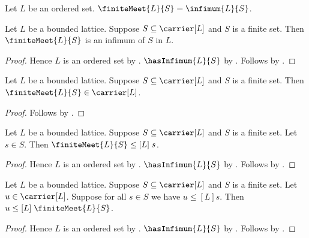 \begin{definition}\label{finite_meet}
    Let $L$ be an ordered set.
    $\finiteMeet{L}{S}=\infimum{L}{S}$.
\end{definition}

\begin{theorem}\label{finite_meet_is_infimum}
    Let $L$ be a bounded lattice.
    Suppose $S\subseteq\carrier[L]$ and $S$ is a finite set.
    Then $\finiteMeet{L}{S}$ is an infimum of $S$ in $L$.
\end{theorem}
\begin{proof}
    Hence $L$ is an ordered set by .
    $\hasInfimum{L}{S}$ by .
    Follows by .
\end{proof}

\begin{proposition}\label{finite_meet_type}
    Let $L$ be a bounded lattice.
    Suppose $S\subseteq\carrier[L]$ and $S$ is a finite set.
    Then $\finiteMeet{L}{S}\in\carrier[L]$.
\end{proposition}
\begin{proof}
    Follows by
        .
\end{proof}

\begin{proposition}\label{finite_meet_lower}
    Let $L$ be a bounded lattice.
    Suppose $S\subseteq\carrier[L]$ and $S$ is a finite set.
    Let $s\in S$.
    Then $\finiteMeet{L}{S}\mathrel{\leq[L]}s$.
\end{proposition}
\begin{proof}
    Hence $L$ is an ordered set by .
    $\hasInfimum{L}{S}$ by .
    Follows by .
\end{proof}

\begin{proposition}\label{finite_meet_greatest}
    Let $L$ be a bounded lattice.
    Suppose $S\subseteq\carrier[L]$ and $S$ is a finite set.
    Let $u\in\carrier[L]$.
    Suppose for all $s\in S$ we have $u\mathrel{\leq[L]}s$.
    Then $u\mathrel{\leq[L]}\finiteMeet{L}{S}$.
\end{proposition}
\begin{proof}
    Hence $L$ is an ordered set by .
    $\hasInfimum{L}{S}$ by .
    Follows by .
\end{proof}

